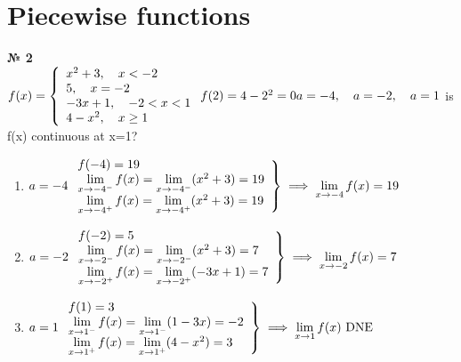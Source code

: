 \documentclass[12pt]{article}
\newenvironment{task}[1][0]{\vspace{.5cm} {\textbf{№ #1} \vspace{.5cm}\\ }\large}{}
\begin{document}
\section{Piecewise functions}
\begin{task}[2]
$f(x) = \left\{
\begin{array}{l}
	x^2+3, \quad x<-2\\
	5, \quad x=-2\\
	-3x+1,\quad -2 < x < 1\\
	4-x^2, \quad x\geq1\\
\end{array}\\
\right.\\
f(2)=4-2^2=0\\
a=-4, \quad a=-2, \quad a=1$  is f(x) continuous at x=1?\\
\begin{enumerate}
	\item {$a=-4\\
\left.
\begin{array}{l}
f(-4)=19\\
\lim\limits_{x \to -4^-} f(x)=\lim\limits_{x \to -4^-}(x^2+3)=19\\
\lim\limits_{x \to -4^+} f(x)=\lim\limits_{x \to -4^+}(x^2+3)=19\\
\end{array} \right\} \implies \lim\limits_{x \to -4} f(x)=19\\
$}
\item{$a=-2\\
\left.
\begin{array}{l}
f(-2)=5\\
\lim\limits_{x \to -2^-} f(x) = \lim\limits_{x \to -2^-} (x^2+3)=7\\
\lim\limits_{x \to -2^+} f(x) = \lim\limits_{x \to -2^+} (-3x+1)=7\\
\end{array}\right\} \implies \lim\limits_{x \to -2} f(x) = 7\\
$}
\item {$a=1\\
\left.
\begin{array}{l}
f(1)=3\\
\lim\limits_{x \to 1^-} f(x) = \lim\limits_{x \to 1^-} (1-3x)=-2\\
\lim\limits_{x \to 1^+} f(x) = \lim\limits_{x \to 1^+} (4-x^2)=3\\
\end{array}	\right\} \implies \lim\limits_{x \to 1}f(x)\text{  DNE}\\
$}
\end{enumerate}
\end{task}
\end{document}
